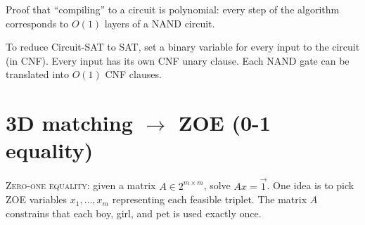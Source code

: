 Proof that ``compiling'' to a circuit is polynomial: every step of the algorithm corresponds to \(O(1)\) layers of a NAND circuit.

To reduce Circuit-SAT to SAT, set a binary variable for every input to the circuit (in CNF).
Every input has its own CNF unary clause.
Each NAND gate can be translated into \(O(1)\) CNF clauses.

\section{3D matching \(\to\) ZOE (0-1 equality)}
\textsc{Zero-one equality}: given a matrix \(A\in 2^{m\times m}\), solve \(Ax = \vec{1}\).
One idea is to pick ZOE variables \(x_1, \ldots, x_m\) representing each feasible triplet.
The matrix \(A\) constrains that each boy, girl, and pet is used exactly once.